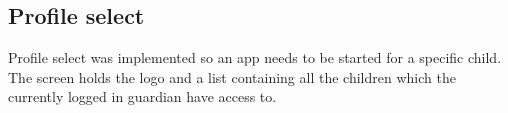 \subsection{Profile select}
\label{backlog:profile_select}

Profile select was implemented so an app needs to be started for a specific child. The screen holds the \giraf[] logo and a list containing all the children which the currently logged in guardian have access to.
